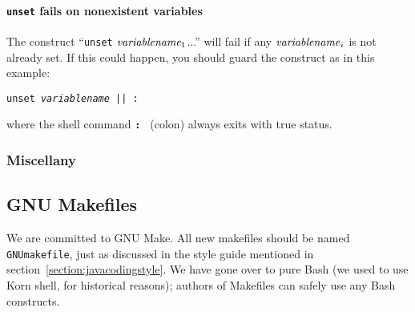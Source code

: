 \paragraph{{\bf \tt unset} fails on nonexistent variables}
The construct ``{\tt unset} \(\mbox{\it variablename}_1\)...'' will
fail if any \(\mbox{{\it variablename\/}}_i\) is not already set.
If this could happen, you should guard the construct as in this
example:
\begin{example}
\tt{}unset {\it{}variablename\/} || :
\end{example} 
where the shell command {\bf \tt : } (colon) always exits with true
status.



\subsubsection{Miscellany}

\subsection{GNU Makefiles} 

We are committed to GNU Make.  All new makefiles should be named {\tt
GNUmakefile}, just as discussed in the \SunR{} style guide mentioned in
section~\ref{section:javacodingstyle}.  We have gone over to pure Bash
(we used to use Korn shell, for historical reasons); authors of
Makefiles can safely use any Bash constructs.

